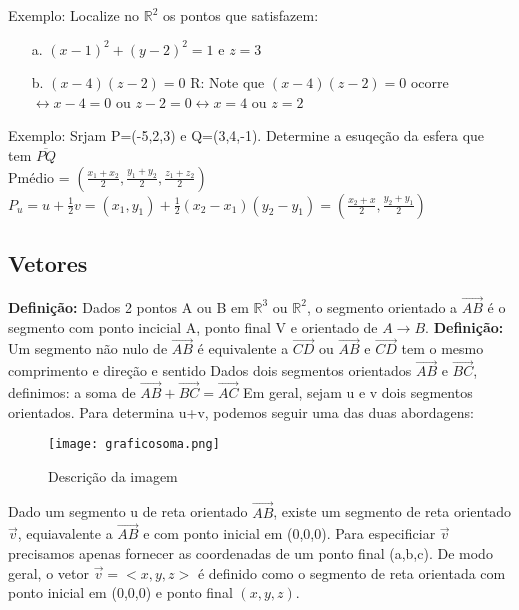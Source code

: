 \date{03.10.2024}

Exemplo: Localize no $\mathbb{R}^2$ os pontos que satisfazem:
\begin{itemize}
    \item[a. ] $(x-1)^2 + (y-2)^2 = 1 $ e $z = 3$
    \item[b. ] $(x-4)(z-2) = 0$ 
        R: Note que $(x-4)(z-2) = 0$ ocorre $\leftrightarrow x -4 = 0$ ou $z-2=0 \leftrightarrow x = 4$ ou $z=2$             
\end{itemize}

Exemplo: Srjam P=(-5,2,3) e Q=(3,4,-1). Determine a esuqeção da esfera que tem $\overline{PQ}$ \\
Pmédio = $\left(\frac{x_1+x_2}{2}, \frac{y_1+y_2}{2}, \frac{z_1+z_2}{2} \right) $
$P_u = u + \frac{1}{2}v = (x_1,y_1)+ \frac{1}{2}(x_2-x_1)(y_2 - y_1) = \left(\frac{x_2+x}{2} , \frac{y_2+y_1}{2} \right)$

\subsection{Vetores}
\textbf{Definição:}
Dados 2 pontos A ou B em $\mathbb{R}^3$ ou $\mathbb{R}^2$, o segmento orientado a $\overrightarrow{AB}$ é o segmento com ponto incicial A, ponto final V e orientado de $A \rightarrow B$.
\textbf{Definição:}
Um segmento não nulo de $\overrightarrow{AB}$ é equivalente a $\overrightarrow{CD}$ ou $\overrightarrow{AB}$ e $\overrightarrow{CD}$ tem o mesmo comprimento e direção e sentido %
Dados dois segmentos orientados $\overrightarrow{AB}$ e $\overrightarrow{BC}$, definimos: a soma de $\overrightarrow{AB} + \overrightarrow{BC} = \overrightarrow{AC}$
Em geral, sejam u e v dois segmentos orientados. Para determina u+v, podemos seguir uma das duas abordagens:
\begin{figure}[!h]
    \centering
    \texttt{[image: graficosoma.png]}
    \caption{Descrição da imagem}
    \label{fig:exemplo}
\end{figure}

Dado um segmento u de reta orientado $\overrightarrow{AB}$, existe um segmento de reta orientado $\overrightarrow{v}$, equiavalente a $\overrightarrow{AB}$ e com ponto inicial em (0,0,0). Para especificiar $\overrightarrow{v}$ precisamos apenas fornecer as coordenadas de um ponto final (a,b,c).
De modo geral, o vetor $\overrightarrow{v} = <x,y,z>$ é definido como o segmento de reta orientada com ponto inicial em (0,0,0) e ponto final $(x,y,z)$.


